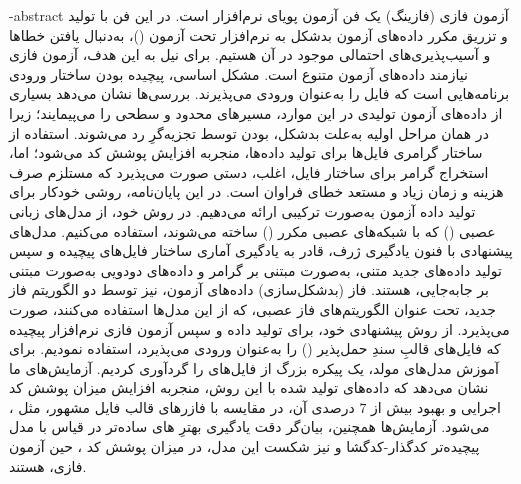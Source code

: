 \hypertarget{abstractfa}{\fa-abstract{
آزمون فازی (فازینگ) یک فن آزمون پویای نرم‌افزار است. در این فن با تولید و تزریق مکرر داده‌های آزمون بدشکل به‌ نرم‌افزار تحت آزمون
()، 
به‌دنبال یافتن خطاها و آسیب‌پذیری‌های احتمالی موجود در آن هستیم. برای نیل به این هدف، آزمون فازی نیازمند داده‌های آزمون متنوع است. 
مشکل اساسی، پیچیده بودن ساختار ورودی‌ برنامه‌هایی است که فایل را به‌عنوان ورودی می‌پذیرند. بررسی‌ها نشان می‌دهد بسیاری از داده‌های آزمون تولیدی در این موارد، مسیرهای محدود و سطحی را می‌پیمایند؛ زیرا در همان مراحل اولیه به‌علت بدشکل، بودن توسط تجزیه‌گرِ  رد می‌شوند. استفاده از ساختار گرامری فایل‌ها برای تولید داده‌ها، منجربه افزایش پوشش کد می‌شود؛ اما، استخراج گرامر برای ساختار فایل، اغلب، دستی صورت می‌پذیرد که مستلزم صرف هزینه و زمان زیاد و مستعد خطای فراوان است. 
در این پایان‌نامه، روشی خودکار برای تولید داده آزمون به‌صورت ترکیبی ارائه می‌دهیم. در روش خود، از مدل‌های زبانی عصبی () که با شبکه‌های عصبی مکرر () ساخته‌ می‌شوند، استفاده می‌کنیم. مدل‌های پیشنهادی با فنون یادگیری ژرف، قادر به یادگیری آماری ساختار فایل‌های پیچیده و سپس تولید داده‌های جدید متنی، به‌صورت مبتنی بر گرامر و داده‌های دودویی به‌صورت مبتنی بر جابه‌جایی، هستند. فاز (بدشکل‌سازی) داده‌های آزمون، نیز توسط دو الگوریتم فاز جدید، تحت عنوان الگوریتم‌های فاز عصبی، که از این مدل‌ها استفاده می‌کنند، صورت می‌پذیرد. 
از روش پیشنهادی خود، برای تولید داده و سپس آزمون فازی نرم‌افزار پیچیده  که فایل‌‌های قالبِ سندِ حمل‌پذیر 
()
را به‌عنوان ورودی می‌پذیرد، استفاده نمودیم. برای آموزش مدل‌های مولد، یک پیکره بزرگ از فایل‌های
 را گردآوری کردیم.  
آزمایش‌‌های ما نشان می‌دهد که داده‌های تولید شده با این روش، منجربه افزایش میزان پوشش کد اجرایی 
 و بهبود بیش از 
 $7$
  درصدی آن، در مقایسه با فازرهای قالب فایل مشهور، مثل ، می‌شود. آزمایش‌‌ها همچنین، بیان‌گر دقت یادگیری بهترِ 
  های
   ساده‌تر در قیاس با مدل‌ پیچیده‌تر کدگذار-کدگشا و نیز شکست این مدل، در میزان پوشش کد ، حین آزمون فازی، هستند.
\\
}}\label{abstractfa2} 


\abstractPage

\newpage\clearpage
